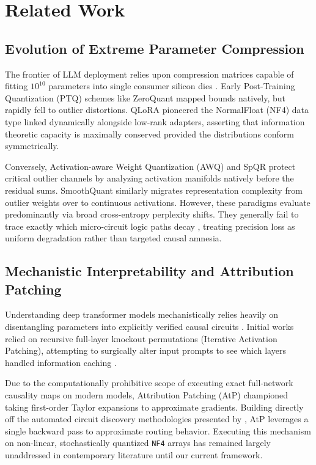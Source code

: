 \documentclass{article}
\begin{document}
\section{Related Work}

\subsection{Evolution of Extreme Parameter Compression}
The frontier of LLM deployment relies upon compression matrices capable of fitting $10^{10}$ parameters into single consumer silicon dies \cite{dar2022hardware}. Early Post-Training Quantization (PTQ) schemes like ZeroQuant \cite{yao2022zeroquant} mapped bounds natively, but rapidly fell to outlier distortions. QLoRA \cite{dettmers2023qlora} pioneered the NormalFloat (NF4) data type linked dynamically alongside low-rank adapters, asserting that information theoretic capacity is maximally conserved provided the distributions conform symmetrically. 

Conversely, Activation-aware Weight Quantization (AWQ) \cite{lin2023awq} and SpQR \cite{dettmers2023spqr} protect critical outlier channels by analyzing activation manifolds natively before the residual sums. SmoothQuant \cite{xiao2023smoothquant} similarly migrates representation complexity from outlier weights over to continuous activations. However, these paradigms evaluate predominantly via broad cross-entropy perplexity shifts. They generally fail to trace exactly which micro-circuit logic paths decay \cite{makelov2024sae}, treating precision loss as uniform degradation rather than targeted causal amnesia.

\subsection{Mechanistic Interpretability and Attribution Patching}
Understanding deep transformer models mechanistically relies heavily on disentangling parameters into explicitly verified causal circuits \cite{wang2022interpretability, olah2020zoom}. Initial works relied on recursive full-layer knockout permutations (Iterative Activation Patching), attempting to surgically alter input prompts to see which layers handled information caching \cite{meng2022locating, geva2021transformer, geva2023dissecting}. 

Due to the computationally prohibitive scope of executing exact full-network causality maps on modern models, Attribution Patching (AtP) \cite{syed2023attribution} championed taking first-order Taylor expansions to approximate gradients. Building directly off the automated circuit discovery methodologies presented by \cite{conmy2023automated}, AtP leverages a single backward pass to approximate routing behavior. Executing this mechanism on non-linear, stochastically quantized \texttt{NF4} arrays has remained largely unaddressed in contemporary literature until our current framework.
\end{document}

